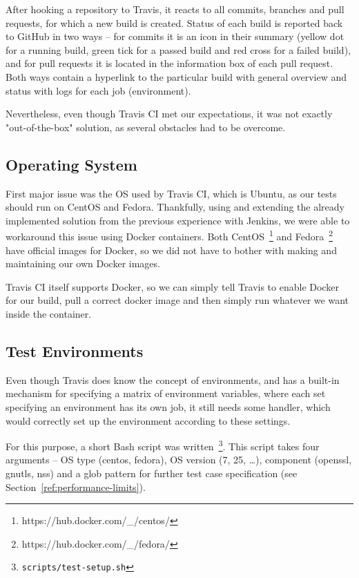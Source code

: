     After hooking a repository to Travis, it reacts to all commits, branches
    and pull requests, for which a new build is created. Status of each build
    is reported back to GitHub in two ways -- for commits it is an icon
    in their summary (yellow dot for a running build, green tick for a passed
    build and red cross for a failed build), and for pull requests it is located
    in the information box of each pull request. Both ways contain
    a hyperlink to the particular
    build with general overview and status with logs for each job (environment).

    Nevertheless, even though Travis CI met our expectations, it was not exactly
    "out-of-the-box" solution, as several obstacles had to be overcome.

\subsection{Operating System}
    First major issue was the OS used by Travis CI, which is Ubuntu, as our
    tests should run on CentOS and Fedora. Thankfully, using and extending the
    already implemented solution from the previous experience with
    Jenkins, we were able to workaround this issue using Docker containers.
    Both CentOS~\footnote{https://hub.docker.com/\_/centos/} and
    Fedora~\footnote{https://hub.docker.com/\_/fedora/} have official images
    for Docker, so we did not have to bother with making and maintaining our
    own Docker images.

    Travis CI itself supports Docker, so we can simply tell Travis to enable
    Docker for our build, pull a correct docker image and then simply run
    whatever we want inside the container.

\subsection{Test Environments}
    Even though Travis does know the concept of environments, and has a built-in
    mechanism for specifying a matrix of environment variables, where each
    set specifying an environment has its own job, it still needs some handler,
    which would correctly set up the environment according to these settings.

    For this purpose, a short Bash script was written~\footnote{\texttt{scripts/test-setup.sh}}.
    This script takes four arguments -- OS type
    (centos, fedora), OS version (7, 25, \dots), component (openssl, gnutls,
    nss) and a glob pattern for further test case specification
    (see Section~\ref{ref:performance-limits}).


